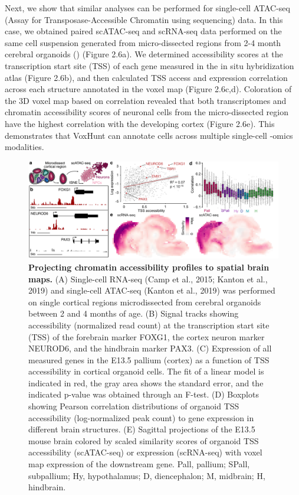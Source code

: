 \clearpage

Next, we show that similar analyses can be performed for single-cell ATAC-seq (Assay for Transposase-Accessible Chromatin using sequencing) data. In this case, we obtained paired scATAC-seq and scRNA-seq data performed on the same cell suspension generated from micro-dissected regions from 2-4 month cerebral organoids (\cite{kanton_organoid_2019}) (Figure 2.6a). We determined accessibility scores at the transcription start site (TSS) of each gene measured in the in situ hybridization atlas (Figure 2.6b), and then calculated TSS access and expression correlation across each structure annotated in the voxel map (Figure 2.6c,d). Coloration of the 3D voxel map based on correlation revealed that both transcriptomes and chromatin accessibility scores of neuronal cells from the micro-dissected region have the highest correlation with the developing cortex (Figure 2.6e). This demonstrates that VoxHunt can annotate cells across multiple single-cell -omics modalities.

\begin{figure}[b!]
    \centering
	\includegraphics[width=\textwidth]{figures/voxhunt/Figure_6}
    \caption{\textbf{Projecting chromatin accessibility profiles to spatial brain maps.} (A) Single-cell RNA-seq (Camp et al., 2015; Kanton et al., 2019) and single-cell ATAC-seq (Kanton et al., 2019) was performed on single cortical regions microdissected from cerebral organoids between 2 and 4 months of age. (B) Signal tracks showing accessibility (normalized read count) at the transcription start site (TSS) of the forebrain marker FOXG1, the cortex neuron marker NEUROD6, and the hindbrain marker PAX3. (C) Expression of all measured genes in the E13.5 pallium (cortex) as a function of TSS accessibility in cortical organoid cells. The fit of a linear model is indicated in red, the gray area shows the standard error, and the indicated p-value was obtained through an F-test. (D) Boxplots showing Pearson correlation distributions of organoid TSS accessibility (log-normalized peak count) to gene expression in different brain structures. (E) Sagittal projections of the E13.5 mouse brain colored by scaled similarity scores of organoid TSS accessibility (scATAC-seq) or expression (scRNA-seq) with voxel map expression of the downstream gene. Pall, pallium; SPall, subpallium; Hy, hypothalamus; D, diencephalon; M, midbrain; H, hindbrain.}
    \label{fig:vox6}
\end{figure}

